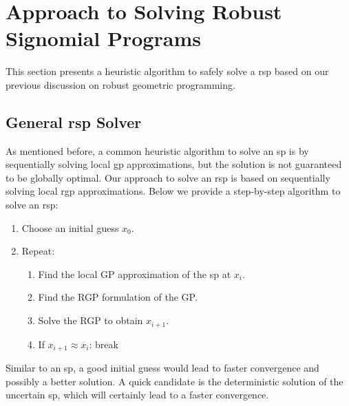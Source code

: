 \section{Approach to Solving Robust Signomial Programs}

This section presents a heuristic algorithm to safely solve a \gls{rsp}
based on our previous discussion on robust geometric programming.

\subsection{General \gls{rsp} Solver}
As mentioned before, a common heuristic algorithm to solve an \gls{sp} is
by sequentially solving local \gls{gp} approximations, but the solution is not guaranteed
to be globally optimal. Our approach to solve an \gls{rsp} is based on sequentially solving
local \gls{rgp} approximations. Below we provide a step-by-step algorithm to solve an \gls{rsp}:

\begin{enumerate}
    \item Choose an initial guess $x_0$.
    \item Repeat:
    \begin{enumerate}
        \item Find the local GP approximation of the \gls{sp} at $x_i$.
        \item Find the RGP formulation of the GP.
        \item Solve the RGP to obtain $x_{i+1}$.
        \item If $x_{i+1} \approx x_{i}$: break
    \end{enumerate}
\end{enumerate}

Similar to an \gls{sp}, a good initial guess would lead to faster convergence and possibly a better solution.
A quick candidate is the deterministic solution of the uncertain \gls{sp}, which will certainly lead to a faster convergence.

